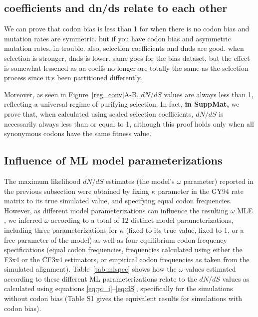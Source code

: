 \documentclass[11pt]{article}
\begin{document}
\subsection*{coefficients and dn/ds relate to each other}

We can prove that codon bias is less than 1 for when there is no codon bias and mutation rates are symmetric. but if you have codon bias and asymmetric mutation rates, in trouble.
also, selection coefficients and dnds are good. when selection is stronger, dnds is lower. same goes for the bias dataset, but the effect is somewhat lessened as aa coeffs no longer are totally the same as the selection process since it;s been partitioned differently.

Moreover, as seen in Figure~\ref{reg_conv}A-B, $dN/dS$ values are always less than 1, reflecting a universal regime of purifying selection. In fact, \textbf{in SuppMat,} we prove that, when calculated using scaled selection coefficients, $dN/dS$ is necessarily always less than or equal to 1, although this proof holds only when all synonymous codons have the same fitness value. 



\subsection*{Influence of ML model parameterizations}

The maximum likelihood $dN/dS$ estimates (the model's $\omega$ parameter) reported in the previous subsection were obtained by fixing $\kappa$ parameter in the GY94 rate matrix to its true simulated value, and specifying equal codon frequencies. However, as different model parameterizations can influence the resulting $\omega$ MLE \cite{YN00,Yang2006,ZhangYu2006}, we inferred $\omega$ according to a total of 12 distinct model parameterizations, including three parameterizations for $\kappa$ (fixed to its true value, fixed to 1, or a free parameter of the model) as well as four equilibrium codon frequency specifications (equal codon frequencies, frequencies calculated using either the F3x4 \cite{MuseGaut1994} or the CF3x4 \cite{Pond2010} estimators, or empirical codon frequencies as taken from the simulated alignment). Table~\ref{tab:mlspec} shows how the $\omega$ values estimated according to these different ML parameterizations relate to the $dN/dS$ values as calculated using equations \eqref{eq:pi_i}--\eqref{eq:dS}, specifically for the simulations without codon bias (Table S1 gives the equivalent results for simulations with codon bias).
\end{document}
